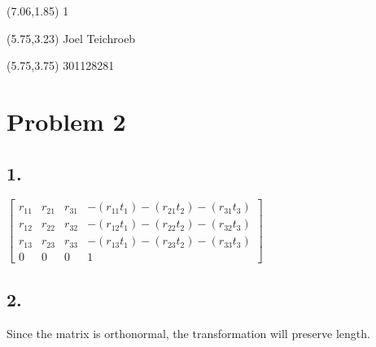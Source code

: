 \documentclass[paper=letter, fontsize=11pt]{scrartcl} %
\author{Joel Teichroeb} %
\date{\normalsize\today} %
\begin{document}
\begin{textblock}{2}(7.06,1.85)
\large
1
\end{textblock}
\begin{textblock}{2}(5.75,3.23)
\large
Joel Teichroeb
\end{textblock}
\begin{textblock}{1}(5.75,3.75)
\large
301128281
\end{textblock}



\clearpage

\section*{Problem 2}
\subsection*{1.}
$\begin{bmatrix}
r_{11} & r_{21} & r_{31} & -(r_{11} t_1) - (r_{21} t_2) - (r_{31} t_3) \\
r_{12} & r_{22} & r_{32} & -(r_{12} t_1) - (r_{22} t_2) - (r_{32} t_3) \\
r_{13} & r_{23} & r_{33} & -(r_{13} t_1) - (r_{23} t_2) - (r_{33} t_3) \\
0      & 0      & 0      & 1 
\end{bmatrix}$
\subsection*{2.}
Since the matrix is orthonormal, the transformation will preserve length.
\end{document}
